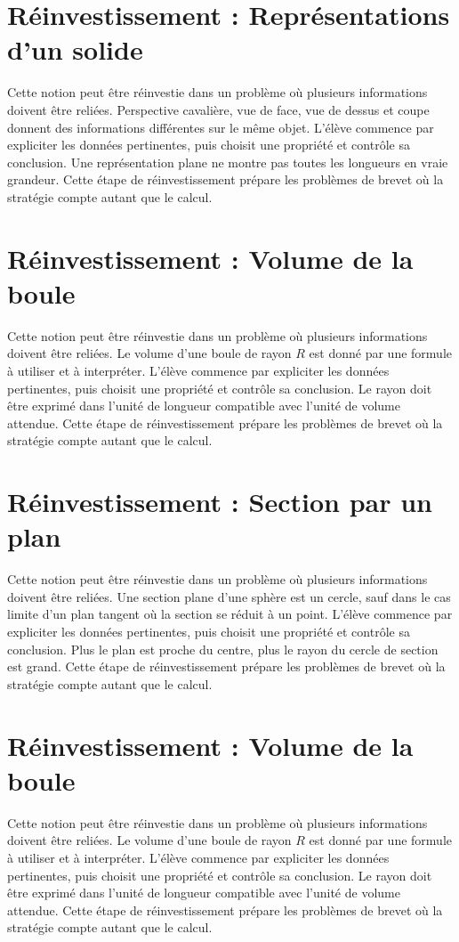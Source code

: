 \section{Réinvestissement : Représentations d’un solide}
Cette notion peut être réinvestie dans un problème où plusieurs informations doivent être reliées. Perspective cavalière, vue de face, vue de dessus et coupe donnent des informations différentes sur le même objet. L’élève commence par expliciter les données pertinentes, puis choisit une propriété et contrôle sa conclusion. Une représentation plane ne montre pas toutes les longueurs en vraie grandeur. Cette étape de réinvestissement prépare les problèmes de brevet où la stratégie compte autant que le calcul.

\section{Réinvestissement : Volume de la boule}
Cette notion peut être réinvestie dans un problème où plusieurs informations doivent être reliées. Le volume d’une boule de rayon $R$ est donné par une formule à utiliser et à interpréter. L’élève commence par expliciter les données pertinentes, puis choisit une propriété et contrôle sa conclusion. Le rayon doit être exprimé dans l’unité de longueur compatible avec l’unité de volume attendue. Cette étape de réinvestissement prépare les problèmes de brevet où la stratégie compte autant que le calcul.

\section{Réinvestissement : Section par un plan}
Cette notion peut être réinvestie dans un problème où plusieurs informations doivent être reliées. Une section plane d’une sphère est un cercle, sauf dans le cas limite d’un plan tangent où la section se réduit à un point. L’élève commence par expliciter les données pertinentes, puis choisit une propriété et contrôle sa conclusion. Plus le plan est proche du centre, plus le rayon du cercle de section est grand. Cette étape de réinvestissement prépare les problèmes de brevet où la stratégie compte autant que le calcul.

\section{Réinvestissement : Volume de la boule}
Cette notion peut être réinvestie dans un problème où plusieurs informations doivent être reliées. Le volume d’une boule de rayon $R$ est donné par une formule à utiliser et à interpréter. L’élève commence par expliciter les données pertinentes, puis choisit une propriété et contrôle sa conclusion. Le rayon doit être exprimé dans l’unité de longueur compatible avec l’unité de volume attendue. Cette étape de réinvestissement prépare les problèmes de brevet où la stratégie compte autant que le calcul.
